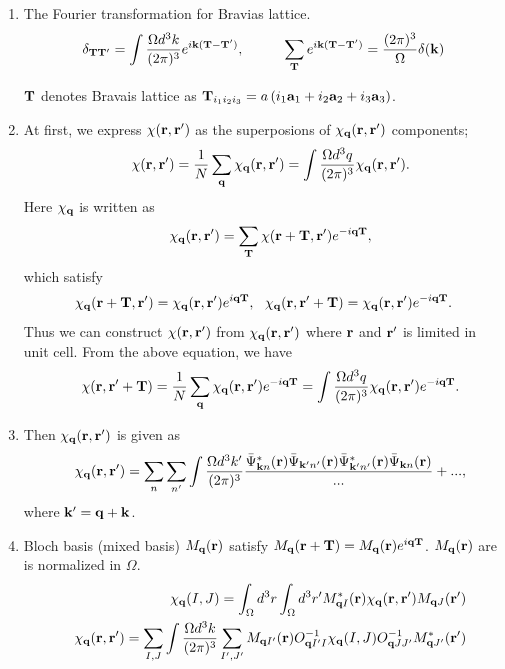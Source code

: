 \documentclass[a4paper,10pt,epsf,fleqn]{article}
\newcommand{\bfq}{{\bf q}}
\newcommand{\bfk}{{\bf k}}
\newcommand{\bfr}{{\bf r}}
\newcommand{\bfa}{{\bf a}}
\newcommand{\bfT}{{\bf T}}
\begin{document}
{{{\begin{enumerate}
\item
The Fourier transformation for Bravias lattice.
\begin{eqnarray}
\delta_{\bfT \bfT'} = 
\int \frac{\Omega d^3 k}{(2 \pi)^3} e^{i \bfk (\bfT-\bfT')}, \hspace{1cm}
\sum_\bfT e^{i \bfk (\bfT -\bfT')} = \frac{(2 \pi)^3}{\Omega} \delta(\bfk)
\end{eqnarray}

$\bfT$ denotes Bravais lattice as 
$\bfT_{i_1 i_2 i_3} = a \left(i_1 \bfa_1 +i_2 \bfa_2 + i_3 \bfa_3 \right)$.

\item
At first, we express $\chi(\bfr,\bfr')$ as the superposions of $\chi_\bfq(\bfr, \bfr')$ components;
\begin{eqnarray}
&&\chi(\bfr, \bfr') = \frac{1}{N} \sum_\bfq \chi_\bfq(\bfr, \bfr')
= \int \frac{\Omega d^3 q }{(2 \pi)^3} \chi_\bfq(\bfr, \bfr').
\end{eqnarray}
Here $\chi_\bfq$ is written as
\begin{eqnarray}
&&\chi_\bfq(\bfr, \bfr') = \sum_\bfT \chi(\bfr+\bfT, \bfr') e^{-i \bfq \bfT},
\end{eqnarray}
which satisfy 
\begin{eqnarray}
\chi_\bfq(\bfr+\bfT, \bfr') = \chi_\bfq(\bfr, \bfr')  e^{i \bfq \bfT}, \ \ 
\chi_\bfq(\bfr, \bfr'+\bfT) = \chi_\bfq(\bfr, \bfr')  e^{-i \bfq \bfT}.
\end{eqnarray}
Thus we can construct $\chi(\bfr, \bfr')$
from $\chi_\bfq(\bfr, \bfr')$ where $\bfr$ and $\bfr'$ is limited in unit cell.
From the above equation, we have
\begin{eqnarray}
&&\chi(\bfr,\bfr'+\bfT)=  \frac{1}{N} \sum_\bfq \chi_\bfq(\bfr, \bfr') e^{-i \bfq \bfT}
= \int \frac{\Omega d^3 q}{(2 \pi)^3} \chi_{\bfq} (\bfr, \bfr') e^{-i \bfq \bfT}.
\end{eqnarray}

\item Then $\chi_\bfq (\bfr, \bfr')$ is given as
\begin{eqnarray}
&&\chi_\bfq (\bfr, \bfr')
= \sum_{n} \sum_{n'} \int \frac{\Omega d^3 k'}{(2 \pi)^3} 
\frac{\bar{\Psi}^*_{\bfk  n }(\bfr)      \bar{\Psi}_{\bfk' n'}(\bfr) 
\bar{\Psi}^*_{\bfk' n'}(\bfr) \bar{\Psi}_{\bfk n  }(\bfr)}{...} + ...,
\end{eqnarray}
where $\bfk' = \bfq+\bfk$. 

\item Bloch basis (mixed basis) $M_\bfq (\bfr)$ satisfy
$M_\bfq (\bfr + \bfT) = M_\bfq(\bfr) e^{i \bfq \bfT}$.
$M_\bfq (\bfr)$ are is normalized in $\Omega$.
\begin{eqnarray}
&& \chi_\bfq(I,J) = 
\int_\Omega d^3r \int_\Omega d^3r' M^*_{\bfq I} (\bfr) \chi_\bfq(\bfr,\bfr') M_{\bfq J} (\bfr')\\
&&\chi_\bfq(\bfr, \bfr') = 
\sum_{I,J} \int \frac{\Omega d^3 k}{(2 \pi)^3} 
\sum_{I',J'} M_{\bfq I'}(\bfr) O^{-1}_{\bfq I' I}\chi_\bfq(I,J) O^{-1}_{\bfq J J'}  M^*_{\bfq J'}(\bfr')
\end{eqnarray}


\end{enumerate}}}}
\end{document}
